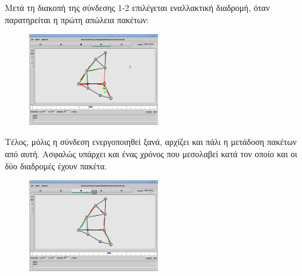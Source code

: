 \documentclass[a4paper,9pt]{article}
\begin{document}
Μετά τη διακοπή της σύνδεσης 1-2 επιλέγεται εναλλακτική διαδρομή, όταν
παρατηρείται η πρώτη απώλεια πακέτων:

\begin{figure}[h]
    \centering
    \includegraphics[width=0.5\textwidth]{files/5.png}
\end{figure}

Τέλος, μόλις η σύνδεση ενεργοποιηθεί ξανά, αρχίζει και πάλι η μετάδοση πακέτων
από αυτή. Ασφαλώς υπάρχει και ένας χρόνος που μεσολαβεί κατά τον οποίο και οι
δύο διαδρομές έχουν πακέτα.

\begin{figure}[h]
    \centering
    \includegraphics[width=0.5\textwidth]{files/6.png}
\end{figure}
\end{document}

